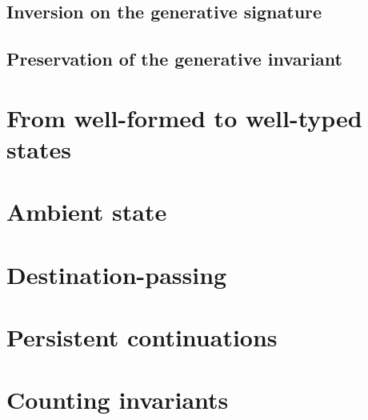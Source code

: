 \subsection{Inversion on the generative signature}

\subsection{Preservation of the generative invariant}

\section{From well-formed to well-typed states}
\label{sec:gen-ordertp}

\section{Ambient state}
\label{sec:gen-state}





\section{Destination-passing}
\label{sec:gen-destinations}


\section{Persistent continuations}
\label{sec:gen-letcc}

\section{Counting invariants}
\label{sec:gen-count}



\label{sec:pointer-inequality}
